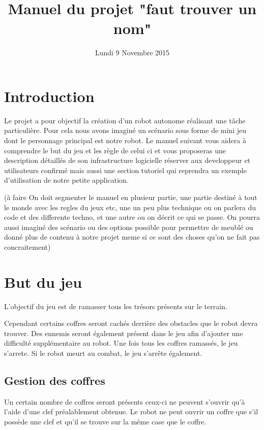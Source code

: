 \documentclass[a4paper 12pts]{article}
\title{Manuel du projet "faut trouver un nom"}
\date{Lundi 9 Novembre 2015}
\author{}
\begin{document}
\maketitle

\section{Introduction}

Le projet a pour objectif la création d'un robot autonome réalisant une tâche particulière.
Pour cela nous avons imaginé un scénario sous forme de mini jeu dont le personnage principal est notre robot.
Le manuel suivant vous aidera à comprendre le but du jeu et les règle de celui ci et vous proposeras une description détaillés de son infrastructure logicielle réserver aux developpeur et utilisateurs confirmé mais aussi une section tutoriel qui reprendra un exemple d'utilisation de notre petite application.

(à faire On doit segmenter le manuel en plusieur partie, une partie destiné à tout le monde avec les regles du jeux etc, une un peu plus technique ou on parlera du code et des differente techno, et une autre ou on décrit ce qui se passe.
On pourra aussi imaginé des scénario ou des options possible pour permettre de meublé ou donné plus de contenu à notre projet meme si ce sont des choses qu'on ne fait pas concraitement)

\section{But du jeu}


L'objectif du jeu est de ramasser tous les trésors présents sur le terrain.


Cependant certains coffres seront cachés derrière des obstacles que le robot devra trouver. Des ennemis seront également présent dans le jeu afin d'ajouter une difficulté supplémentaire au robot.
Une fois tous les coffres ramassés, le jeu s'arrete.
Si le robot meurt au combat, le jeu s'arrête également.


\subsection{Gestion des coffres}


Un certain nombre de coffres seront présents ceux-ci ne peuvent s'ouvrir qu'à l'aide d'une clef préalablement obtenue.
Le robot ne peut ouvrir un coffre que s'il possède une clef et qu'il se trouve sur la même case que le coffre.
\end{document}
